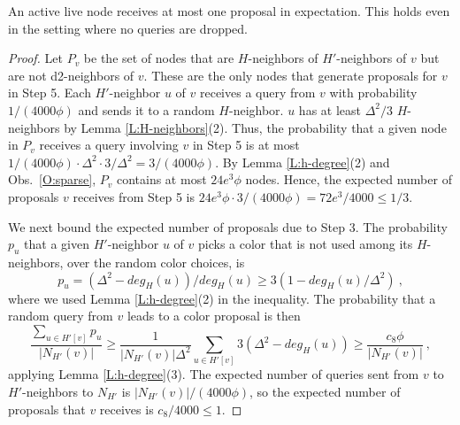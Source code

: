 \begin{lemma}
An active live node receives at most one proposal in expectation. This holds even in the setting where no queries are dropped. 
\label{L:proposal-expected}
\end{lemma}
\begin{proof}
  Let $P_v$ be the set of nodes that are $H$-neighbors of $H'$-neighbors of $v$ but are not d2-neighbors of $v$. These are the only nodes that generate proposals for $v$ in Step 5. Each $H'$-neighbor $u$ of $v$ receives a query from $v$ with probability $1/(4000\phi)$ and sends it to a random $H$-neighbor. $u$ has at least $\Delta^2/3$ $H$-neighbors by Lemma \ref{L:H-neighbors}(2). Thus, the probability that a given node in $P_v$ receives a query involving $v$ in Step 5 is at most $1/(4000\phi) \cdot \Delta^2 \cdot 3/\Delta^2 = 3/(4000\phi)$. By Lemma \ref{L:h-degree}(2) and Obs.~\ref{O:sparse}, $P_v$ contains at most $24 e^3 \phi$ nodes. Hence, the expected number of proposals $v$ receives from Step 5 is $24 e^3\phi \cdot 3/(4000\phi) = 72e^3/4000 \le 1/3$.

We next bound the expected number of proposals due to Step 3.
The probability $p_u$ that a given $H'$-neighbor $u$ of $v$ picks a color that is not used among its $H$-neighbors, over the random color choices, is 
\[p_u = (\Delta^2 - deg_{H}(u))/deg_{H}(u) \ge 3(1 - deg_H(u)/\Delta^2)\ , \] 
where we used Lemma \ref{L:h-degree}(2) in the inequality.
The probability that a random query from $v$ leads to a color proposal is then 
  \[ \frac{\sum_{u \in H'[v]} p_u}{|N_{H'}(v)|} \ge \frac{1}{|N_{H'}(v)|\Delta^2} \sum_{u \in H'[v]} 3 \left(\Delta^2 - deg_H(u)\right) \ge  \frac{c_8 \phi}{|N_{H'}(v)|}\ ,  \]  
applying Lemma \ref{L:h-degree}(3). The expected number of queries sent from $v$ to $H'$-neighbors to $N_{H'}$ is $|N_{H'}(v)|/(4000\phi)$, so the expected number of proposals that $v$ receives is $c_8/4000 \le 1$.
\end{proof}


